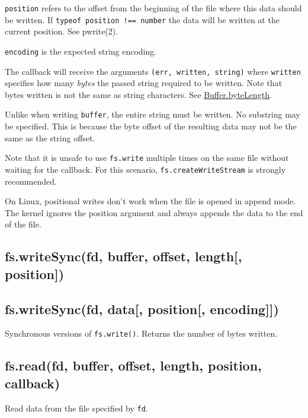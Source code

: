 \texttt{position} refers to the offset from the beginning of the file
where this data should be written. If
\texttt{typeof\ position\ !==\ \textquotesingle{}number\textquotesingle{}}
the data will be written at the current position. See pwrite(2).

\texttt{encoding} is the expected string encoding.

The callback will receive the arguments
\texttt{(err,\ written,\ string)} where \texttt{written} specifies how
many \emph{bytes} the passed string required to be written. Note that
bytes written is not the same as string characters. See
\href{buffer.html\#buffer_class_method_buffer_bytelength_string_encoding}{Buffer.byteLength}.

Unlike when writing \texttt{buffer}, the entire string must be written.
No substring may be specified. This is because the byte offset of the
resulting data may not be the same as the string offset.

Note that it is unsafe to use \texttt{fs.write} multiple times on the
same file without waiting for the callback. For this scenario,
\texttt{fs.createWriteStream} is strongly recommended.

On Linux, positional writes don't work when the file is opened in append
mode. The kernel ignores the position argument and always appends the
data to the end of the file.

\subsection{fs.writeSync(fd, buffer, offset, length{[},
position{]})}\label{fs.writesyncfd-buffer-offset-length-position}

\subsection{fs.writeSync(fd, data{[}, position{[},
encoding{]}{]})}\label{fs.writesyncfd-data-position-encoding}

Synchronous versions of \texttt{fs.write()}. Returns the number of bytes
written.

\subsection{fs.read(fd, buffer, offset, length, position,
callback)}\label{fs.readfd-buffer-offset-length-position-callback}

Read data from the file specified by \texttt{fd}.

